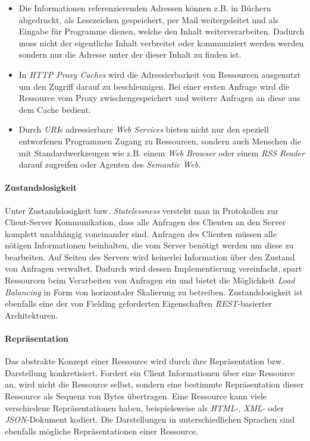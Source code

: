 \begin{itemize}
\item Die Informationen referenzierenden Adressen können z.B. in
  Büchern abgedruckt, als Lesezeichen gespeichert, per Mail
  weitergeleitet und als Eingabe für Programme dienen, welche den
  Inhalt weiterverarbeiten. Dadurch muss nicht der eigentliche Inhalt
  verbreitet oder kommuniziert werden werden sondern nur die Adresse
  unter der dieser Inhalt zu finden ist.
\item In \textit{HTTP Proxy Caches} wird die Adressierbarkeit von
  Ressourcen ausgenutzt um den Zugriff darauf zu beschleunigen. Bei
  einer ersten Anfrage wird die Ressource vom Proxy
  zwischengespeichert und weitere Anfragen an diese aus dem Cache
  bedient.
\item Durch \textit{URI}s adressierbare \textit{Web Services} bieten
  nicht nur den speziell entworfenen Programmen Zugang zu Ressourcen,
  sondern auch Menschen die mit Standardwerkzeugen wie z.B. einem
  \textit{Web Browser} oder einem \textit{RSS Reader} darauf zugreifen
  oder Agenten des \textit{Semantic Web}.
\end{itemize}

\paragraph{Zustandslosigkeit}

Unter Zustandslosigkeit bzw. \textit{Statelessness} versteht man in
Protokollen zur Client-Server Kommunikation, dass alle Anfragen des
Clienten an den Server komplett unabhängig voneinander sind. Anfragen
des Clienten müssen alle nötigen Informationen beinhalten, die vom
Server benötigt werden um diese zu bearbeiten. Auf Seiten des Servers
wird keinerlei Information über den Zustand von Anfragen
verwaltet. Dadurch wird dessen Implementierung vereinfacht, spart
Ressourcen beim Verarbeiten von Anfragen ein und bietet die
Möglichkeit \textit{Load Balancing} in Form von horizontaler
Skalierung zu betreiben. Zustandslosigkeit ist ebenfalls eine der von
Fielding geforderten Eigenschaften \textit{REST}-basierter
Architekturen.

\paragraph{Repräsentation}

Das abstrakte Konzept einer Ressource wird durch ihre Repräsentation
bzw. Darstellung konkretisiert. Fordert ein Client Informationen über
eine Ressource an, wird nicht die Ressource selbst, sondern eine
bestimmte Repräsentation dieser Ressource als Sequenz von Bytes
übertragen. Eine Ressource kann viele verschiedene Repräsentationen
haben, beispielsweise als \textit{HTML-},
 \textit{XML-} oder
\textit{JSON-}Dokument 
kodiert. Die Darstellungen in unterschiedlichen Sprachen sind
ebenfalls mögliche Repräsentationen einer Ressource. 

